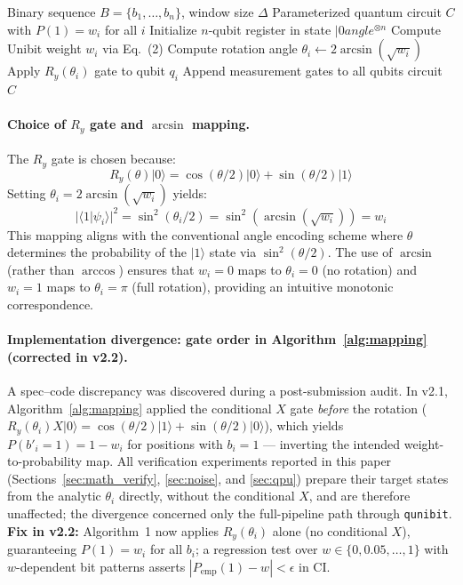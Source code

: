 ﻿\documentclass[12pt,a4paper]{article}
\begin{document}
\begin{algorithm}[H]
\caption{Unibit-to-Quantum Circuit Mapping (v2.2 corrected)}
\label{alg:mapping}
\begin{algorithmic}[1]
\Require Binary sequence $B = \{b_1, \dots, b_n\}$, window size $\Delta$
\Ensure Parameterized quantum circuit $C$ with $P(1)=w_i$ for all $i$
\State Initialize $n$-qubit register in state $|0
angle^{\otimes n}$
    \State Compute Unibit weight $w_i$ via Eq.~(2)
    \State Compute rotation angle $\theta_i \leftarrow 2\arcsin(\sqrt{w_i})$
    \State Apply $R_y(\theta_i)$ gate to qubit $q_i$ 
\EndFor
\State Append measurement gates to all qubits
\State \Return circuit $C$
\end{algorithmic}
\end{algorithm}

\paragraph{Choice of $R_y$ gate and $\arcsin$ mapping.} The $R_y$ gate is chosen because:
\begin{equation}
    R_y(\theta)|0\rangle = \cos(\theta/2)|0\rangle + \sin(\theta/2)|1\rangle
\end{equation}
Setting $\theta_i = 2\arcsin(\sqrt{w_i})$ yields:
\begin{equation}
    |\langle 1|\psi_i\rangle|^2 = \sin^2(\theta_i/2) = \sin^2(\arcsin(\sqrt{w_i})) = w_i
\end{equation}
This mapping aligns with the conventional angle encoding scheme where $\theta$ determines the probability of the $|1\rangle$ state via $\sin^2(\theta/2)$. The use of $\arcsin$ (rather than $\arccos$) ensures that $w_i = 0$ maps to $\theta_i = 0$ (no rotation) and $w_i = 1$ maps to $\theta_i = \pi$ (full rotation), providing an intuitive monotonic correspondence.

\paragraph{Implementation divergence: gate order in Algorithm~\ref{alg:mapping} (corrected in v2.2).} A spec--code discrepancy was discovered during a post-submission audit. In v2.1, Algorithm~\ref{alg:mapping} applied the conditional $X$ gate \emph{before} the rotation ($R_y(\theta_i)X|0\rangle = \cos(\theta/2)|1\rangle + \sin(\theta/2)|0\rangle$), which yields $P(b'_i = 1) = 1 - w_i$ for positions with $b_i = 1$ --- inverting the intended weight-to-probability map. All verification experiments reported in this paper (Sections~\ref{sec:math_verify}, \ref{sec:noise}, and \ref{sec:qpu}) prepare their target states from the analytic $\theta_i$ directly, without the conditional $X$, and are therefore unaffected; the divergence concerned only the full-pipeline path through \texttt{qunibit}. \textbf{Fix in v2.2:} Algorithm~1 now applies $R_y(\theta_i)$ alone (no conditional $X$), guaranteeing $P(1)=w_i$ for all $b_i$; a regression test over $w\in\{0,0.05,\ldots,1\}$ with $w$-dependent bit patterns asserts $|P_{\mathrm{emp}}(1)-w|<\epsilon$ in CI.
\end{document}
